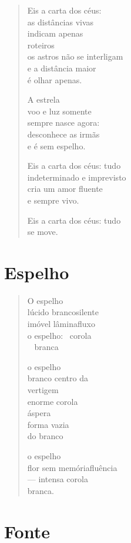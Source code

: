 \begin{verse}
Eis a carta dos céus:\\
as distâncias vivas\\
indicam apenas\\
roteiros\\
os astros não se interligam\\
e a distância maior\\
é olhar apenas.

A estrela\\
voo e luz somente\\
sempre nasce agora:\\
desconhece as irmãs\\
e é sem espelho.

Eis a carta dos céus: tudo\\
indeterminado e imprevisto\\
cria um amor fluente\\
e sempre vivo.

Eis a carta dos céus: tudo\\
\qquad\qquad\qquad\qquad se move.
\end{verse}


\chapter{Espelho}

\begin{verse}
O espelho\\
lúcido branco\qquad silente\\
imóvel lâmina\qquad fluxo\\
o espelho:\qquad\quad\mbox{ } corola\\
\qquad\qquad\qquad\quad\mbox{  } branca

o espelho\\
branco centro da\\
\qquad\qquad\qquad\qquad vertigem\\
enorme corola\\
\qquad\qquad\qquad\qquad áspera\\
forma vazia\\
do branco

o espelho\\
flor sem memória\quad fluência\\
--- intensa corola\\
\quad branca.
\end{verse}


\chapter{Fonte}

